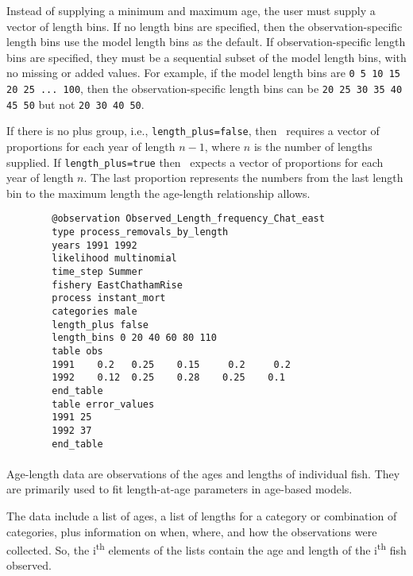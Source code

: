 Instead of supplying a minimum and maximum age, the user must supply a vector of length bins. If no length bins are specified, then the observation-specific length bins use the model length bins as the default. If observation-specific length bins are specified, they must be a sequential subset of the model length bins, with no missing or added values. For example, if the model length bins are \texttt{0 5 10 15 20 25 ... 100}, then the observation-specific length bins can be \texttt{20 25 30 35 40 45 50} but not \texttt{20 30 40 50}.

If there is no plus group, i.e., \texttt{length\_plus=false}, then \CNAME\ requires a vector of proportions for each year of length $n - 1$, where $n$ is the number of lengths supplied. If \texttt{length\_plus=true} then \CNAME\ expects a vector of proportions for each year of length $n$. The last proportion represents the numbers from the last length bin to the maximum length the age-length relationship allows.

{\small{\begin{verbatim}
		@observation Observed_Length_frequency_Chat_east
		type process_removals_by_length
		years 1991 1992
		likelihood multinomial
		time_step Summer
		fishery EastChathamRise
		process instant_mort
		categories male
		length_plus false
		length_bins 0 20 40 60 80 110
		table obs
		1991    0.2   0.25    0.15     0.2     0.2
		1992    0.12  0.25    0.28    0.25    0.1
		end_table
		table error_values
		1991 25
		1992 37
		end_table
		\end{verbatim}}}

\paragraph*{}\label{sec:Observation-AgeSize}
Age-length data are observations of the ages and lengths of individual fish. They are primarily used to fit length-at-age parameters in age-based models. 

The data include a list of ages, a list of lengths for a category or combination of categories, plus information on when, where, and how the observations were collected. So, the i\textsuperscript{th} elements of the lists contain the age and length of the i\textsuperscript{th} fish observed.

